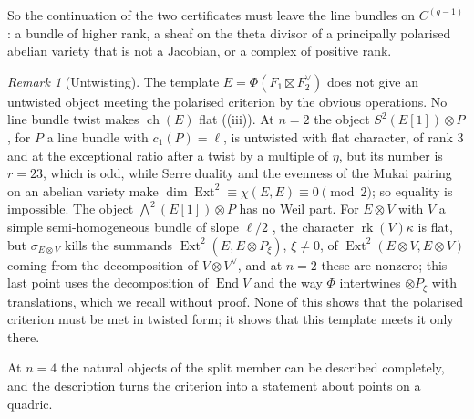 \documentclass[11pt,reqno]{amsart}
\theoremstyle{plain}
\theoremstyle{definition}
\theoremstyle{remark}
\newtheorem{remark}[theorem]{Remark}
\DeclareMathOperator{\ch}{ch}
\DeclareMathOperator{\rk}{rk}
\DeclareMathOperator{\End}{End}
\DeclareMathOperator{\Ext}{Ext}
\begin{document}
So the continuation of the two certificates must leave the line bundles on
$C^{(g-1)}$: a bundle of higher rank, a sheaf on the theta divisor of a
principally polarised abelian variety that is not a Jacobian, or a complex of
positive rank.

\begin{remark}[Untwisting]\label{rem:untwisting}
The template $E=\Phi(F_{1}\boxtimes F_{2}^{\vee})$ does not give an untwisted
object meeting the polarised criterion by the obvious operations. No line
bundle twist makes $\ch(E)$ flat ((iii)). At $n=2$ the
object $S^{2}(E[1])\otimes P$, for $P$ a line bundle with $c_{1}(P)=\ell$, is
untwisted with flat character, of rank $3$ and at the exceptional ratio after
a twist by a multiple of $\eta$, but its number is $r=23$, which is odd, while
Serre duality and the evenness of the Mukai pairing on an abelian variety make
$\dim\Ext^{2}\equiv\chi(E,E)\equiv0\pmod2$; so equality is impossible. The
object $\bigwedge^{2}(E[1])\otimes P$ has no Weil part. For $E\otimes V$ with $V$ a
simple semi-homogeneous bundle of slope $\ell/2$ \cite{Muk78}, the character
$\rk(V)\kappa$ is flat, but $\sigma_{E\otimes V}$ kills the summands
$\Ext^{2}(E,E\otimes P_{\xi})$, $\xi\ne0$, of $\Ext^{2}(E\otimes V,E\otimes V)$
coming from the decomposition of $V\otimes V^{\vee}$, and at $n=2$ these are
nonzero; this last point uses the decomposition of $\End V$ and the way
$\Phi$ intertwines $\otimes P_{\xi}$ with translations, which we recall
without proof. None of this shows that the polarised criterion must be met in
twisted form; it shows that this template meets it only there.
\end{remark}

At $n=4$ the natural objects of the split member can be described completely,
and the description turns the criterion into a statement about points on a
quadric.
\end{document}
